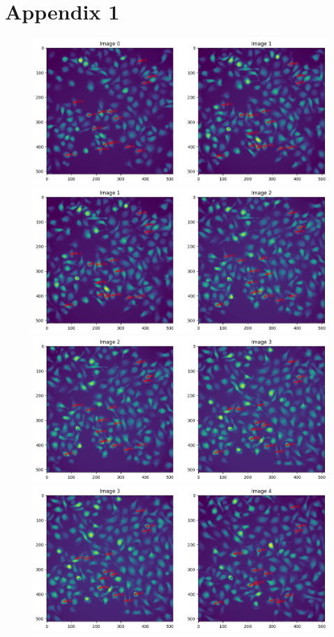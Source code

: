 \documentclass{article}
\begin{document}
\section*{Appendix 1}


\begin{figure}[h!]
\centering
\includegraphics[width=0.75\linewidth]{Report/RImages/Traces_Growth/trace-b1.png}
\includegraphics[width=0.75\linewidth]{Report/RImages/Traces_Growth/trace-b2.png}
\includegraphics[width=0.75\linewidth]{Report/RImages/Traces_Growth/trace-b3.png}
\includegraphics[width=0.75\linewidth]{Report/RImages/Traces_Growth/trace-b4.png}
\end{figure}
\end{document}
